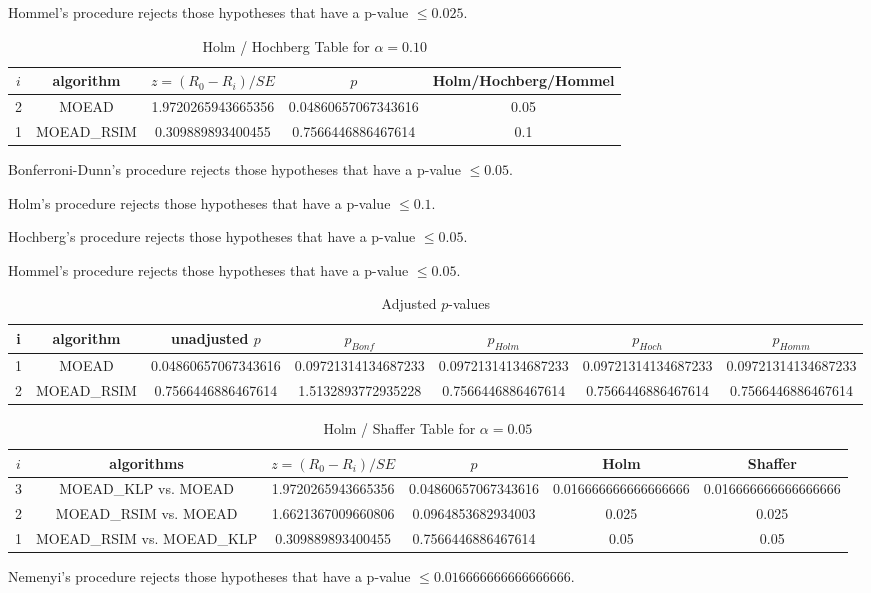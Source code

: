\documentclass[a4paper,10pt]{article}
\begin{document}
\begin{landscape}
Hommel's procedure rejects those hypotheses that have a p-value $\le0.025$.


\begin{table}[!htp]
\centering\tiny
\caption{Holm / Hochberg Table for $\alpha=0.10$}
\begin{tabular}{ccccc}
$i$&algorithm&$z=(R_0 - R_i)/SE$&$p$&Holm/Hochberg/Hommel\\
\hline
2&MOEAD&1.9720265943665356&0.04860657067343616&0.05\\
1&MOEAD_RSIM&0.309889893400455&0.7566446886467614&0.1\\
\hline
\end{tabular}
\end{table}
Bonferroni-Dunn's procedure rejects those hypotheses that have a p-value $\le0.05$.


Holm's procedure rejects those hypotheses that have a p-value $\le0.1$.


Hochberg's procedure rejects those hypotheses that have a p-value $\le0.05$.


Hommel's procedure rejects those hypotheses that have a p-value $\le0.05$.


\begin{table}[!htp]
\centering\tiny
\caption{Adjusted $p$-values}
\begin{tabular}{ccccccc}
i&algorithm&unadjusted $p$&$p_{Bonf}$&$p_{Holm}$&$p_{Hoch}$&$p_{Homm}$\\
\hline
1&MOEAD&0.04860657067343616&0.09721314134687233&0.09721314134687233&0.09721314134687233&0.09721314134687233\\
2&MOEAD_RSIM&0.7566446886467614&1.5132893772935228&0.7566446886467614&0.7566446886467614&0.7566446886467614\\
\hline
\end{tabular}
\end{table}

\begin{table}[!htp]
\centering\tiny
\caption{Holm / Shaffer Table for $\alpha=0.05$}
\begin{tabular}{cccccc}
$i$&algorithms&$z=(R_0 - R_i)/SE$&$p$&Holm&Shaffer\\
\hline
3&MOEAD_KLP vs. MOEAD&1.9720265943665356&0.04860657067343616&0.016666666666666666&0.016666666666666666\\
2&MOEAD_RSIM vs. MOEAD&1.6621367009660806&0.0964853682934003&0.025&0.025\\
1&MOEAD_RSIM vs. MOEAD_KLP&0.309889893400455&0.7566446886467614&0.05&0.05\\
\hline
\end{tabular}
\end{table}
Nemenyi's procedure rejects those hypotheses that have a p-value $\le0.016666666666666666$.



\end{landscape}
\end{document}
